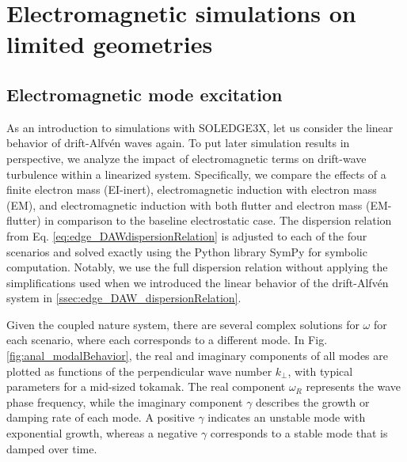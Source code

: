 \chapter{Electromagnetic simulations on limited geometries}
\label{chap:analSimulations}

\section{Electromagnetic mode excitation}
\label{sec:anal_DAW_modeExcitation}

As an introduction to simulations with SOLEDGE3X, let us consider the linear behavior of drift-Alfvén waves again. To put later simulation results in perspective, we analyze the impact of electromagnetic terms on drift-wave turbulence within a linearized system. Specifically, we compare the effects of a finite electron mass (EI-inert), electromagnetic induction with electron mass (EM), and electromagnetic induction with both flutter and electron mass (EM-flutter) in comparison to the baseline electrostatic case. The dispersion relation from Eq. \ref{eq:edge_DAWdispersionRelation} is adjusted to each of the four scenarios and solved exactly using the Python library SymPy for symbolic computation. Notably, we use the full dispersion relation without applying the simplifications used when we introduced the linear behavior of the drift-Alfvén system in \autoref{ssec:edge_DAW_dispersionRelation}. 

Given the coupled nature system, there are several complex solutions for $\omega$ for each scenario, where each corresponds to a different mode. In Fig. \ref{fig:anal_modalBehavior}, the real and imaginary components of all modes are plotted as functions of the perpendicular wave number $k_\perp$, with typical parameters for a mid-sized tokamak. The real component $\omega_R$ represents the wave phase frequency, while the imaginary component $\gamma$ describes the growth or damping rate of each mode. A positive $\gamma$ indicates an unstable mode with exponential growth, whereas a negative $\gamma$ corresponds to a stable mode that is damped over time.

